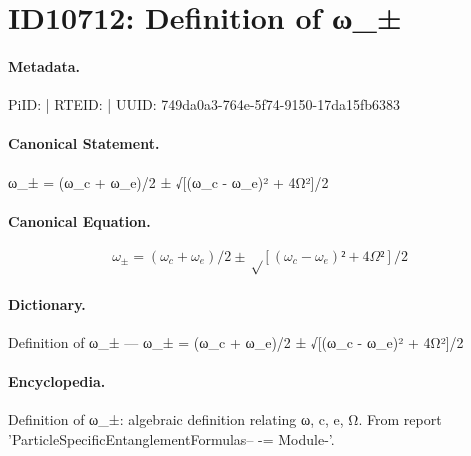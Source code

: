 \section*{ID10712: Definition of ω\_±}
\paragraph{Metadata.}
PiID:  | RTEID:  | UUID: 749da0a3-764e-5f74-9150-17da15fb6383

\paragraph{Canonical Statement.}
ω\_± = (ω\_c + ω\_e)/2 ± √[(ω\_c - ω\_e)² + 4Ω²]/2

\paragraph{Canonical Equation.}
\[
ω_± = (ω_c + ω_e)/2 ± √[(ω_c - ω_e)² + 4Ω²]/2
\]

\paragraph{Dictionary.}
Definition of ω\_± — ω\_± = (ω\_c + ω\_e)/2 ± √[(ω\_c - ω\_e)² + 4Ω²]/2

\paragraph{Encyclopedia.}
Definition of ω\_±: algebraic definition relating ω, c, e, Ω. From report 'ParticleSpecificEntanglementFormulas-- -= Module-'.
